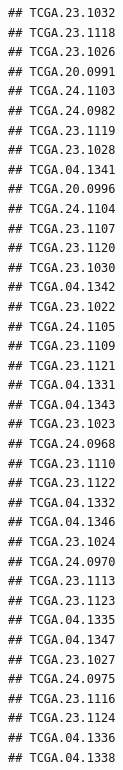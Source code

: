 \documentclass[UTF8]{beamer}\usepackage[]{graphicx}\usepackage[]{color}
\makeatletter
\newenvironment{kframe}{%
 \def\at@end@of@kframe{}%
 \ifinner\ifhmode%
  \def\at@end@of@kframe{\end{minipage}}%
  \begin{minipage}{\columnwidth}%
 \fi\fi%
 \def\FrameCommand##1{\hskip\@totalleftmargin \hskip-\fboxsep
 \colorbox{shadecolor}{##1}\hskip-\fboxsep
     \hskip-\linewidth \hskip-\@totalleftmargin \hskip\columnwidth}%
 \MakeFramed {\advance\hsize-\width
   \@totalleftmargin\z@ \linewidth\hsize
   \@setminipage}}%
 {\par\unskip\endMakeFramed%
 \at@end@of@kframe}
\newenvironment{knitrout}{}{} %
\makeatother
\begin{document}
\begin{frame}[fragile]
\begin{knitrout}
\begin{kframe}
\begin{verbatim}
## TCGA.23.1032                                                    
## TCGA.23.1118                                                    
## TCGA.23.1026                                                    
## TCGA.20.0991                                                    
## TCGA.24.1103                                                    
## TCGA.24.0982                                                    
## TCGA.23.1119                                                    
## TCGA.23.1028                                                    
## TCGA.04.1341                                                    
## TCGA.20.0996                                                    
## TCGA.24.1104                                                    
## TCGA.23.1107                                                    
## TCGA.23.1120                                                    
## TCGA.23.1030                                                    
## TCGA.04.1342                                                    
## TCGA.23.1022                                                    
## TCGA.24.1105                                                    
## TCGA.23.1109                                                    
## TCGA.23.1121                                                    
## TCGA.04.1331                                                    
## TCGA.04.1343                                                    
## TCGA.23.1023                                                    
## TCGA.24.0968                                                    
## TCGA.23.1110                                                    
## TCGA.23.1122                                                    
## TCGA.04.1332                                                    
## TCGA.04.1346                                                    
## TCGA.23.1024                                                    
## TCGA.24.0970                                                    
## TCGA.23.1113                                                    
## TCGA.23.1123                                                    
## TCGA.04.1335                                                    
## TCGA.04.1347                                                    
## TCGA.23.1027                                                    
## TCGA.24.0975                                                    
## TCGA.23.1116                                                    
## TCGA.23.1124                                                    
## TCGA.04.1336                                                    
## TCGA.04.1338                                                    

\end{verbatim}
\end{kframe}
\end{knitrout}
\end{frame}
\end{document}
